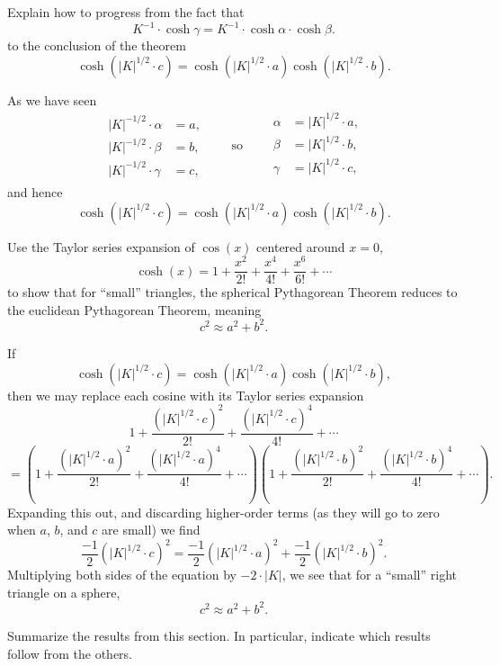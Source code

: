 \documentclass{ximera}
\begin{document}
\begin{problem}
  Explain how to progress from the fact that
  \[
  K^{-1}\cdot \cosh \gamma = K^{-1} \cdot \cosh\alpha \cdot \cosh\beta.
  \]
  to the conclusion of the theorem
  \[
  \cosh\left(|K|^{1/2}\cdot c\right)=\cosh\left(|K|^{1/2} \cdot a\right)\cosh\left(|K|^{1/2}\cdot b\right).
  \]
  \begin{freeResponse}
    As we have seen
    \[
    \begin{split}
      |K|^{-1/2}\cdot \alpha &= a,\\
      |K|^{-1/2}\cdot \beta  &= b,\\
      |K|^{-1/2}\cdot \gamma &= c,
    \end{split}
    \qquad\text{so}\qquad
    \begin{split}
      \alpha &= |K|^{1/2} \cdot a,\\
      \beta  &= |K|^{1/2} \cdot b,\\
      \gamma &= |K|^{1/2} \cdot c,\\
    \end{split}
    \]
    and hence
    \[
      \cosh\left(|K|^{1/2}\cdot c\right)=\cosh\left(|K|^{1/2} \cdot a\right)\cosh\left(|K|^{1/2}\cdot b\right).
    \]
  \end{freeResponse}
\end{problem}


\begin{problem}
  Use the Taylor series expansion of $\cos(x)$ centered around $x=0$,
  \[
  \cosh(x) = 1 + \frac{x^2}{2!} + \frac{x^4}{4!} + \frac{x^6}{6!} + \cdots
  \]
to show that for ``small'' triangles, the spherical Pythagorean
Theorem reduces to the euclidean Pythagorean Theorem, meaning
\[
c^2 \approx a^2+b^2.
\]
\begin{freeResponse}
  If
  \[
  \cosh\left(|K|^{1/2}\cdot c\right)=\cosh\left(|K|^{1/2}\cdot a\right)\cosh\left(|K|^{1/2}\cdot b\right),
  \]
  then we may replace each cosine with its Taylor series expansion
  \[
  1 + \frac{\left(|K|^{1/2}\cdot c\right)^2}{2!} + \frac{\left(|K|^{1/2}\cdot c\right)^4}{4!} +  \cdots
  \]
  \[
  =\left(
  1 + \frac{\left(|K|^{1/2}\cdot a\right)^2}{2!} + \frac{\left(|K|^{1/2}\cdot a\right)^4}{4!} +  \cdots
  \right)
  \left(
  1 + \frac{\left(|K|^{1/2}\cdot b\right)^2}{2!} + \frac{\left(|K|^{1/2}\cdot b\right)^4}{4!} + \cdots
  \right).
  \]
  Expanding this out, and discarding higher-order terms (as they will
  go to zero when $a$, $b$, and $c$ are small) we find
  \[
  \frac{-1}{2}\left(|K|^{1/2}\cdot c\right)^2 = \frac{-1}{2}\left(|K|^{1/2}\cdot a\right)^2+\frac{-1}{2}\left(|K|^{1/2}\cdot b\right)^2.
  \]
  Multiplying both sides of the equation by $-2\cdot |K|$, we see that for a
  ``small'' right triangle on a sphere,
  \[
  c^2 \approx a^2 +b^2.
  \]
\end{freeResponse}
\end{problem}


\begin{problem}
Summarize the results from this section. In particular, indicate which
results follow from the others.
\begin{freeResponse}
\end{freeResponse}
\end{problem}
\end{document}
